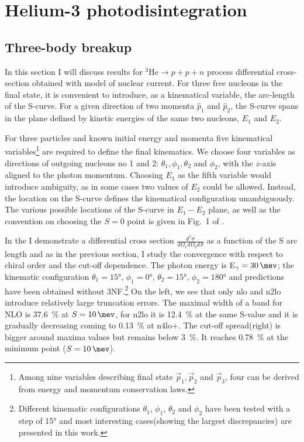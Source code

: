 \clearpage

\section{Helium-3 photodisintegration}
\label{sec:hel_results}

\subsection{Three-body breakup}
\label{sec:hel_3N}

    In this section I will discuss results
    for $^3\text{He} \rightarrow p + p + n$ process differential
    cross-section obtained with  model of nuclear current.
    For three free nucleons in the final state, it is convenient to
    introduce, as a kinematical variable, the arc-length of the S-curve.
    For a given direction of two momenta $\hat{p}_1$ and $\hat{p}_2$,
    the S-curve spans in the plane defined by kinetic energies of the 
    same two nucleons, $E_1$ and $E_2$.

    For three particles and known initial energy and momenta five kinematical
    variables\footnote{Among nine variables describing final state 
    $\vec{p}_1,\vec{p}_2$ and $\vec{p}_3$, four can be derived from 
    energy and momentum conservation laws.}
    are required to define the final kinematics.
    We choose four variables as directions of outgoing nucleons no 1 and 2:
    $\theta_1, \phi_1, \theta_2$ and $\phi_2$, with the $z$-axis aligned to the 
    photon momentum. Choosing $E_1$ as the fifth variable would introduce
    ambiguity, as in some cases two values of $E_2$ could be allowed.
    Instead, the location on the S-curve defines the kinematical configuration
    unambiguously.
    The various possible locations of the S-curve in $E_1-E_2$ plane,
    as well as the convention on choosing the $S=0$ point is given
    in Fig.~1 of \cite{GLOCKLE_report_1996}.
    
    In the  I demonstrate a differential cross section 
    $\frac{d^5\sigma}{d\Omega_1d\Omega_2dS}$ as a function of the S arc length
    and as in the previous section, I study the convergence with respect to chiral
    order and the cut-off dependence.
    The photon energy is  E$_\gamma=\SI{30}{\mev}$; the kinematic configuration
    $\theta_1 = \ang{15}$, $\phi_1 = \ang{0}$,
    $\theta_2 = \ang{15}$, $\phi_2 = \ang{180}$ and predictions have been
    obtained without 3NF.\footnote{Different kinematic configurations $\theta_1$, $\phi_1$,
    $\theta_2$ and $\phi_2$ have been tested with a step of \ang{15}
    and most interesting cases(showing the largest discrepancies) are presented in this work.}
    On the left, we see that only \gls{nlo} and \gls{n2lo} introduce relatively large truncation errors.
    The maximal width of a band for NLO is \SI{37.6}{\percent} at $S=\SI{10}{\mev}$,
    for \gls{n2lo} it is \SI{12.4}{\percent} at the same S-value and it is gradually decreasing
    coming to \SI{0.13}{\percent} at \gls{n4lo+}.
    The cut-off spread(right) is bigger around maxima values but remains below
    \SI{3}{\percent}. It reaches
    \SI{0.78}{\percent} at the minimum point ($S=\SI{10}{\mev}$).
    

